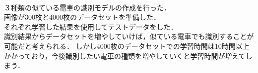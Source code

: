 
\begin{description}
	\item [似ている電車の識別] ~\\
	\item ３種類の似ている電車の識別モデルの作成を行った．\\
	画像が300枚と4000枚のデータセットを準備した．\\
	それぞれ学習した結果を使用してテストデータをした．
	\href{run:./fig/hikaku/hikaku_demo.mp4}{\textcolor[hsb]{0.0, 0.7, 1.0}{\faPlayCircle[regular]}}\\
	識別結果からデータセットを増やしていけば，似ている電車でも識別することが可能だと考えられる．
	しかし4000枚のデータセットでの学習時間は10時間以上かかっており，今後識別したい電車の種類を増やしていくと学習時間が増えてしまう．


\end{description}



